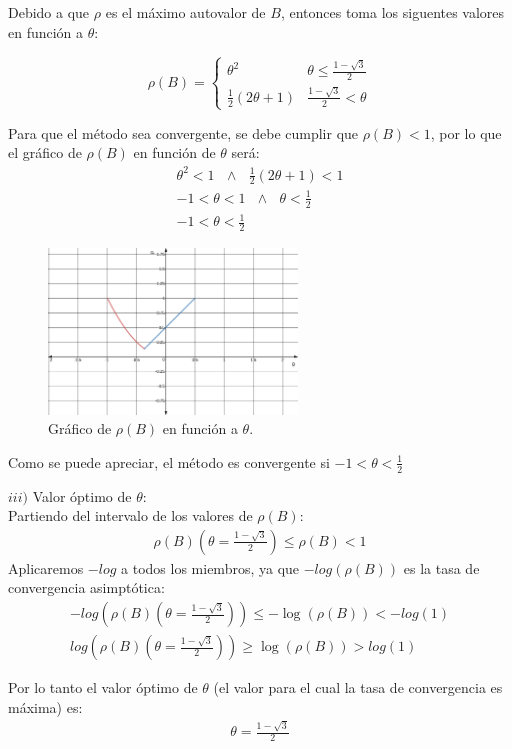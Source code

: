 \begin{itemize}
Debido a que $\rho$ es el máximo autovalor de $B$, entonces toma los siguentes valores en función a $\theta$:

\[   
\rho(B) = 
     \begin{cases}
       \theta^2 & \theta\leq\frac{1-\sqrt{3}}{2}\\
       \frac{1}{2}(2\theta + 1) & \frac{1-\sqrt{3}}{2}<\theta
     \end{cases}
\]

Para que el método sea convergente, se debe cumplir que $\rho(B) < 1$, por lo que el gráfico de $\rho(B)$ en función de $\theta$ será:
\begin{gather*}
    \theta^2 < 1\>\>\>\wedge\>\>\> \frac{1}{2}(2\theta + 1) < 1\\
    -1 < \theta < 1\>\>\>\wedge\>\>\> \theta < \frac{1}{2}\\
    -1 < \theta < \frac{1}{2}
\end{gather*}

\begin{figure}[H]
  \centering
  \includegraphics[width=250px]{images/graph2_q5.png}
  \caption{Gr\'afico de $\rho(B)$ en funci\'on a $\theta$.}
  \label{fig:graph6}
\end{figure}

Como se puede apreciar, el método es convergente si $-1 < \theta < \frac{1}{2}$

$iii)$ Valor óptimo de $\theta$:\\
Partiendo del intervalo de los valores de $\rho(B)$:
\begin{gather*}
    \rho(B)(\theta = \frac{1-\sqrt{3}}{2}) \leq \rho(B) < 1
\end{gather*}
Aplicaremos $-log$ a todos los miembros, ya que $-log(\rho(B))$ es la tasa de convergencia asimptótica:
\begin{gather*}
    -log(\rho(B)(\theta = \frac{1-\sqrt{3}}{2})) \leq -\log(\rho(B)) < -log(1)\\
    log(\rho(B)(\theta = \frac{1-\sqrt{3}}{2})) \geq \log(\rho(B)) > log(1)
\end{gather*}

Por lo tanto el valor óptimo de $\theta$ (el valor para el cual la tasa de convergencia es máxima) es:
\begin{gather*}
    \theta = \frac{1-\sqrt{3}}{2}
\end{gather*}

\end{itemize}